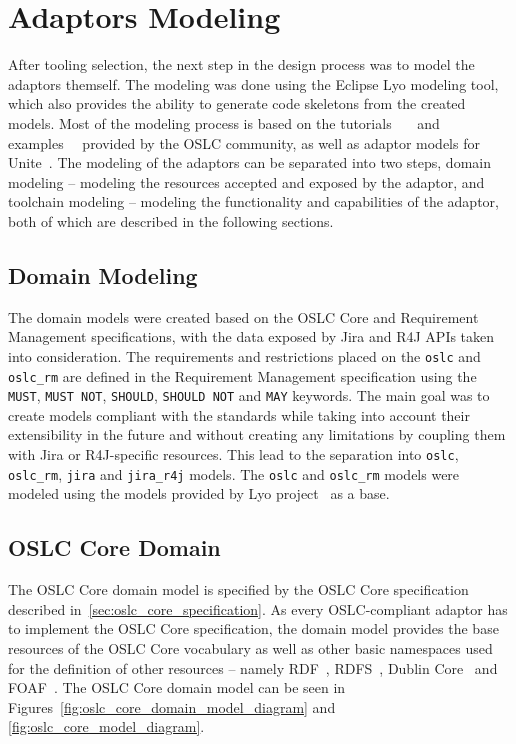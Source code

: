 \section{Adaptors Modeling}
\label{sec:adaptors_modeling}
After tooling selection, the next step in the design process was to model the adaptors themself. The modeling was done using the Eclipse Lyo modeling tool, which also provides the ability to generate code skeletons from the created models. Most of the modeling process is based on the tutorials \cite{oslc_domain_workshop} \cite{oslc_toolchain_workshop} \cite{youtube_lyo_tutorial} and examples \cite{github_oslc_lyo-adaptor-sample-modelling} \cite{github_oslc_bugzilla} provided by the OSLC community, as well as adaptor models for Unite \cite{unite_gitlab}. The modeling of the adaptors can be separated into two steps, domain modeling -- modeling the resources accepted and exposed by the adaptor, and toolchain modeling -- modeling the functionality and capabilities of the adaptor, both of which are described in the following sections.

\subsection{Domain Modeling}
The domain models were created based on the OSLC Core and Requirement Management specifications, with the data exposed by Jira and R4J APIs taken into consideration. The requirements and restrictions placed on the \texttt{oslc} and \texttt{oslc\_rm} are defined in the Requirement Management specification using the \texttt{MUST}, \texttt{MUST NOT}, \texttt{SHOULD}, \texttt{SHOULD NOT} and \texttt{MAY} keywords. The main goal was to create models compliant with the standards while taking into account their extensibility in the future and without creating any limitations by coupling them with Jira or R4J-specific resources. This lead to the separation into \texttt{oslc}, \texttt{oslc\_rm}, \texttt{jira} and \texttt{jira\_r4j} models. The \texttt{oslc} and \texttt{oslc\_rm} models were modeled using the models provided by Lyo project \cite{lyo_domains} as a base.

\subsection*{OSLC Core Domain}
The OSLC Core domain model is specified by the OSLC Core specification described in \ref{sec:oslc_core_specification}. As every OSLC-compliant adaptor has to implement the OSLC Core specification, the domain model provides the base resources of the OSLC Core vocabulary as well as other basic namespaces used for the definition of other resources -- namely RDF \cite{rdf_namespace}, RDFS \cite{rdfs_namespace}, Dublin Core \cite{dcterms_namespace} and FOAF \cite{foaf_namespace}. The OSLC Core domain model can be seen in Figures \ref{fig:oslc_core_domain_model_diagram} and \ref{fig:oslc_core_model_diagram}.

